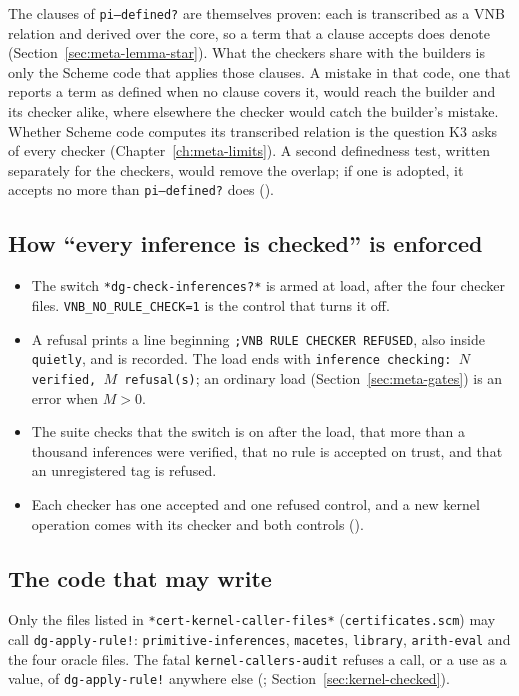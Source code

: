 The clauses of \texttt{pi--defined?} are themselves proven: each is
transcribed as a VNB relation and derived over the core, so a term that
a clause accepts does denote (Section~\ref{sec:meta-lemma-star}).  What
the checkers share with the builders is only the Scheme code that
applies those clauses.  A mistake in that code, one that reports a term
as defined when no clause covers it, would reach the builder and its
checker alike, where elsewhere the checker would catch the builder's
mistake.  Whether Scheme code computes its transcribed relation is the
question K3 asks of every checker (Chapter~\ref{ch:meta-limits}).  A
second definedness
test, written separately for the checkers, would remove the overlap; if
one is adopted, it accepts no more than \texttt{pi--defined?} does
().

\subsection{How ``every inference is checked'' is enforced}

\begin{itemize}
\item The switch \texttt{*dg-check-inferences?*} is armed at load, after
  the four checker files.  \texttt{VNB\_NO\_RULE\_CHECK=1} is the control
  that turns it off.
\item A refusal prints a line beginning \texttt{;VNB RULE CHECKER
  REFUSED}, also inside \texttt{quietly}, and is recorded.  The load ends
  with \texttt{inference checking: $N$ verified, $M$ refusal(s)}; an
  ordinary load (Section~\ref{sec:meta-gates}) is an error when $M>0$.
\item The suite checks that the switch is on after the load, that more
  than a thousand inferences were verified, that no rule is accepted on
  trust, and that an unregistered tag is refused.
\item Each checker has one accepted and one refused control, and a new
  kernel operation comes with its checker and both controls ().
\end{itemize}

\subsection{The code that may write}

Only the files listed in \texttt{*cert-kernel-caller-files*}
(\texttt{certificates.scm}) may call \texttt{dg-apply-rule!}:
\texttt{primitive-inferences}, \texttt{macetes}, \texttt{library},
\texttt{arith-eval} and the four oracle files.  The fatal
\texttt{kernel-callers-audit} refuses a call, or a use as a value, of
\texttt{dg-apply-rule!} anywhere else (;
Section~\ref{sec:kernel-checked}).

